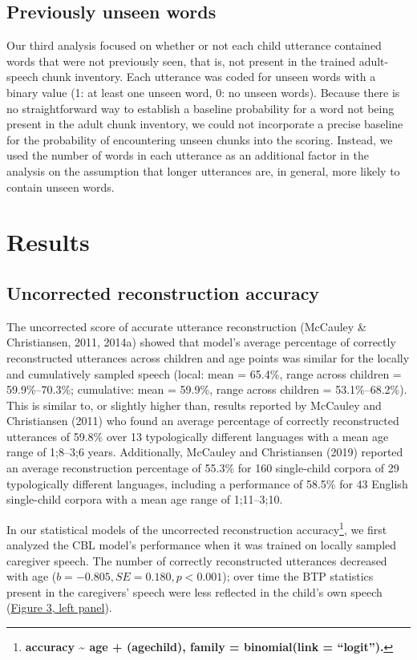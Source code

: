 \documentclass[man,mask,floatsintext]{apa6}
\let\rmarkdownfootnote\footnote%
\def\footnote{\protect\rmarkdownfootnote}
\begin{document}
\subsection{Previously unseen words}\label{previously-unseen-words}

Our third analysis focused on whether or not each child utterance
contained words that were not previously seen, that is, not present in
the trained adult-speech chunk inventory. Each utterance was coded for
unseen words with a binary value (1: at least one unseen word, 0: no
unseen words). Because there is no straightforward way to establish a
baseline probability for a word not being present in the adult chunk
inventory, we could not incorporate a precise baseline for the
probability of encountering unseen chunks into the scoring. Instead, we
used the number of words in each utterance as an additional factor in
the analysis on the assumption that longer utterances are, in general,
more likely to contain unseen words.

\section{Results}\label{results}

\subsection{Uncorrected reconstruction
accuracy}\label{uncorrected-reconstruction-accuracy}

The uncorrected score of accurate utterance reconstruction (McCauley \&
Christiansen, 2011, 2014a) showed that model's average percentage of
correctly reconstructed utterances across children and age points was
similar for the locally and cumulatively sampled speech (local: mean =
65.4\%, range across children = 59.9\%--70.3\%; cumulative: mean =
59.9\%, range across children = 53.1\%--68.2\%). This is similar to, or
slightly higher than, results reported by McCauley and Christiansen
(2011) who found an average percentage of correctly reconstructed
utterances of 59.8\% over 13 typologically different languages with a
mean age range of 1;8--3;6 years. Additionally, McCauley and
Christiansen (2019) reported an average reconstruction percentage of
55.3\% for 160 single-child corpora of 29 typologically different
languages, including a performance of 58.5\% for 43 English single-child
corpora with a mean age range of 1;11--3;10.

In our statistical models of the uncorrected reconstruction
accuracy\footnote{\textbf{accuracy \textasciitilde{} age +
  (age\textbar{}child), family = binomial(link = \enquote{logit}).}}, we
first analyzed the CBL model's performance when it was trained on
locally sampled caregiver speech. The number of correctly reconstructed
utterances decreased with age (\(b = -0.805, SE = 0.180, p < 0.001\));
over time the BTP statistics present in the caregivers' speech were less
reflected in the child's own speech (\protect\hyperlink{fig3}{Figure 3,
left panel}).
\end{document}
